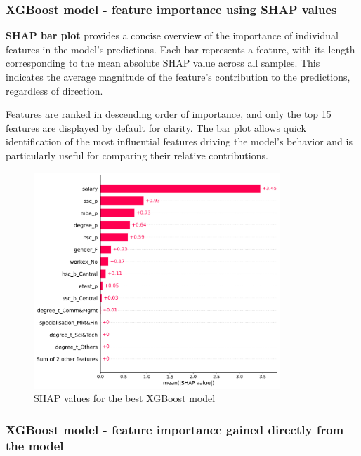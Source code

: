 \documentclass{article}%
\begin{document}
\subsubsection{XGBoost model {-} feature importance using SHAP values}%
\label{ssubsec:XGBoostmodel{-}featureimportanceusingSHAPvalues}%

        \textbf{SHAP bar plot} provides a concise overview of the importance of individual features in the model's predictions. 
        Each bar represents a feature, with its length corresponding to the mean absolute SHAP value across all samples. 
        This indicates the average magnitude of the feature's contribution to the predictions, regardless of direction.

        \hspace{20px}Features are ranked in descending order of importance, and only the top 15 features are displayed by default for clarity.
        The bar plot allows quick identification of the most influential features driving the model's behavior and is particularly useful for comparing their relative contributions.\\
        \newline                     


\begin{figure}[h!]%
\centering%
\includegraphics[width=350px]{XAI/XGBoost/global_feature_importance_shap.png}%
\caption{SHAP values for the best XGBoost model}%
\end{figure}

%
\newpage%
\subsubsection{XGBoost model {-} feature importance gained directly from the model}%
\label{ssubsec:XGBoostmodel{-}featureimportancegaineddirectlyfromthemodel}%
\end{document}

